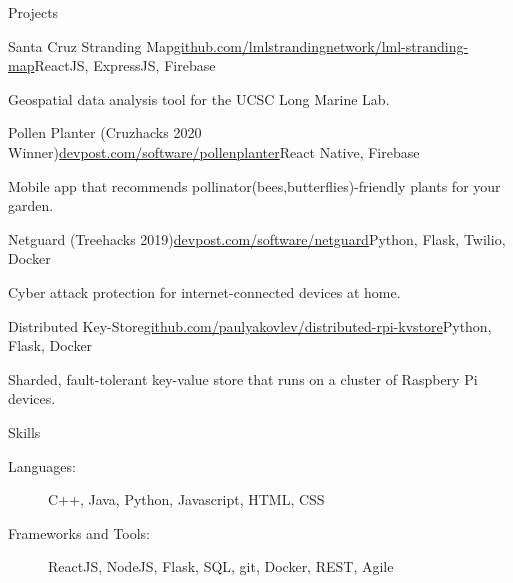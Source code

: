 \documentclass{resume} %
\begin{document}
\begin{rSection}{Projects}
    \begin{rSubsection}{Santa Cruz Stranding Map}{\href{https://github.com/lmlstrandingnetwork/lml-stranding-map}{github.com/lmlstrandingnetwork/lml-stranding-map}}{ReactJS, ExpressJS, Firebase}{}
        \item Geospatial data analysis tool for the UCSC Long Marine Lab.
    \end{rSubsection}

    \begin{rSubsection}{Pollen Planter (Cruzhacks 2020 Winner)}{\href{https://www.devpost.com/software/pollenplanter}{devpost.com/software/pollenplanter}}{React Native, Firebase}{}
        \item Mobile app that recommends pollinator(bees,butterflies)-friendly plants for your garden.
    \end{rSubsection}

    \begin{rSubsection}{Netguard (Treehacks 2019)}{\href{https://www.devpost.com/software/netguard}{devpost.com/software/netguard}}{Python, Flask, Twilio, Docker}{}
        \item Cyber attack protection for internet-connected devices at home.
    \end{rSubsection}

    \begin{rSubsection}{Distributed Key-Store}{\href{https://github.com/paulyakovlev/distributed-rpi-kvstore}{github.com/paulyakovlev/distributed-rpi-kvstore}}{Python, Flask, Docker}{}
        \item Sharded, fault-tolerant key-value store that runs on a cluster of Raspbery Pi devices.
    \end{rSubsection}
\end{rSection}


\begin{rSection}{Skills}
    \begin{description}
    \item[Languages:] C++, Java, Python, Javascript, HTML, CSS
    \item[Frameworks and Tools:] ReactJS, NodeJS, Flask, SQL, git, Docker, REST, Agile
    \end{description}
\end{rSection}





\end{document}

